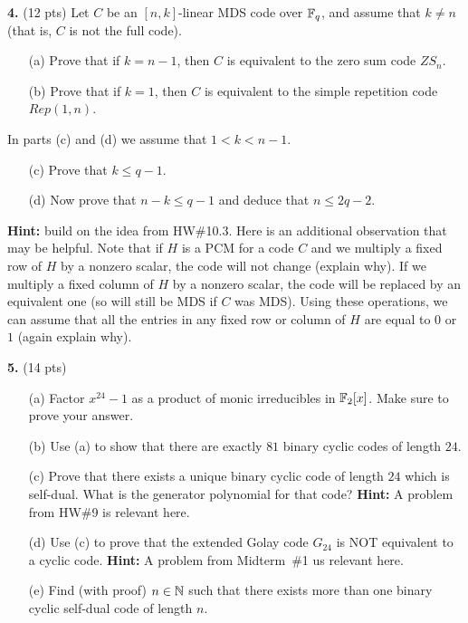 \documentclass[12pt]{amsart}
\begin{document}
{\bf 4.} (12 pts)
Let $C$ be an $[n,k]$-linear MDS code over ${\mathbb F}_q$, and assume that $k\neq n$ (that is, $C$ is not the full code).
\begin{itemize}
\item[(a)] Prove that if $k=n-1$, then $C$ is equivalent to the zero sum code $ZS_n$.
\item[(b)] Prove that if $k=1$, then $C$ is equivalent to the simple repetition code $Rep(1,n)$.
\end{itemize}
In parts (c) and (d) we assume that $1<k<n-1$.
\begin{itemize}
\item[(c)] Prove that $k\leq q-1$. 
\item[(d)] Now prove that $n-k\leq q-1$ and deduce that $n\leq 2q-2$.
\end{itemize}
{\bf Hint:} build on the idea from HW\#10.3. Here is an additional observation that may be helpful. 
Note that if $H$ is a PCM for a code $C$ and we multiply a fixed row of $H$ by a nonzero scalar,
the code will not change (explain why). If we multiply a fixed column of $H$ by a nonzero scalar, the code will be replaced by an equivalent one
(so will still be MDS if $C$ was MDS). Using these operations, we can assume that all the entries in any fixed row or column of $H$ are equal to
$0$ or $1$ (again explain why).  

\skv
\newpage
{\bf 5.} (14 pts)

\begin{itemize}
\item[(a)] Factor $x^{24}-1$ as a product of monic irreducibles in ${\mathbb F}_2[x]$. Make sure to prove your answer.
\item[(b)] Use (a) to show that there are exactly $81$ binary cyclic codes of length $24$.
\item[(c)] Prove that there exists a unique binary cyclic code of length $24$ which is self-dual. What is the generator polynomial for that code? {\bf Hint:} A problem from HW\#9 is relevant here.
\item[(d)] Use (c) to prove that the extended Golay code $G_{24}$ is NOT equivalent to a cyclic code. {\bf Hint:} A problem from Midterm~\#1
us relevant here.
\item[(e)] Find (with proof) $n\in{\mathbb N}$ such that there exists more than one binary cyclic self-dual code of length $n$.
\end{itemize}
 
\end{document}
